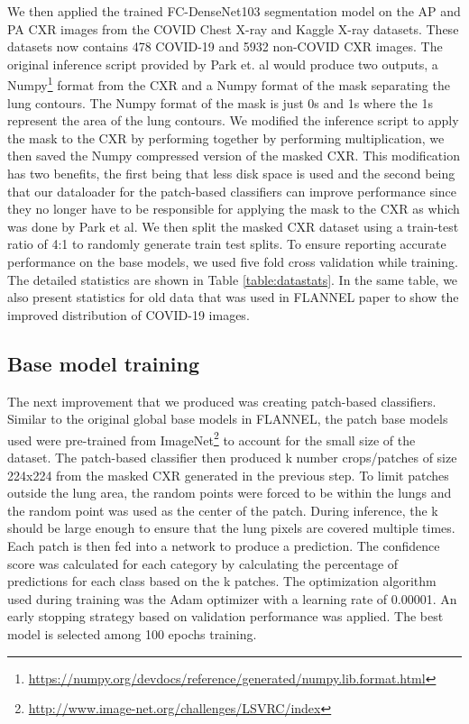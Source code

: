 \documentclass{sigkddExp}
\begin{document}
We then applied the trained FC-DenseNet103 segmentation model on the AP and PA
CXR images from the COVID Chest X-ray and Kaggle X-ray datasets. These datasets now
contains 478 COVID-19 and 5932 non-COVID CXR images. The original
inference script provided by Park et. al would produce two outputs, a Numpy\footnote{
    \url{https://numpy.org/devdocs/reference/generated/numpy.lib.format.html}} format
from the CXR and a Numpy format of the mask separating the lung
contours. The Numpy format of the mask is just 0s and 1s where the 1s
represent the area of the lung contours.  We modified the inference script to
apply the mask to the CXR by performing together by performing multiplication,
we then saved the Numpy compressed version of the masked CXR. This modification
has two benefits, the first being that less disk space is used and the second
being that our dataloader for the patch-based classifiers can improve
performance since they no longer have to be responsible for applying the mask to
the CXR as which was done by Park et al. We then split the masked CXR dataset
using a train-test ratio of 4:1 to randomly generate train test splits. To
ensure reporting accurate performance on the base models, we used five fold
cross validation while training. The detailed statistics are shown in Table
\ref{table:datastats}. In the same table, we also present statistics for old data
that was used in FLANNEL paper \cite{10.1093/jamia/ocaa280} to show the improved
distribution of COVID-19 images.

\subsection{Base model training}
The next improvement that we produced was creating patch-based classifiers.
Similar to the original global base models in FLANNEL, the patch base models
used were pre-trained from
ImageNet\footnote{\url{http://www.image-net.org/challenges/LSVRC/index}} to account
for the small size of the dataset. The patch-based classifier then produced k
number crops/patches of size 224x224 from the masked CXR generated in the
previous step. To limit patches outside the lung area, the random points were
forced to be within the lungs and the random point was used as the center of the
patch. During inference, the k should be large enough to ensure that the lung
pixels are covered multiple times. Each patch is then fed into a network to
produce a prediction. The confidence score was calculated for each category by
calculating the percentage of predictions for each class based on the k patches.
The optimization algorithm used during training was the Adam optimizer with a
learning rate of 0.00001. An early stopping strategy based on validation
performance was applied. The best model is selected among 100 epochs training.
\end{document}
